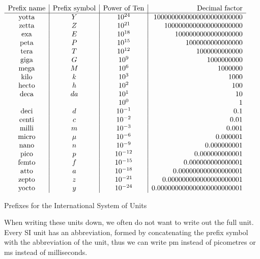 \documentclass{report}
\begin{document}
\begin{table}[h]
  \centering
  $\begin{array}{c|c|c | r}
    \text{Prefix name} & \text{Prefix symbol} & \text{Power of Ten} & \text{Decimal factor}\\
	\hline
	\text{yotta} & Y & 10^{24} & 1 000 000 000 000 000 000 000 000 \\
	\text{zetta} & Z & 10^{21} & 1 000 000 000 000 000 000 000 \\
	\text{exa} & E & 10^{18} &  1 000 000 000 000 000 000\\
	\text{peta} & P & 10^{15} & 1 000 000 000 000 000 \\
	\text{tera} & T & 10^{12} & 1 000 000 000 000 \\
	\text{giga} & G & 10^{9} & 1 000 000 000 \\
	\text{mega} & M & 10^{6} & 1 000 000 \\
	\text{kilo} & k & 10^{3} & 1 000 \\
	\text{hecto} & h & 10^2 & 100 \\
	\text{deca} & da & 10^1 & 10 \\
	& & 10^0 & 1 \\
	\text{deci} & d & 10^{-1} & 0.1 \\
	\text{centi} & c & 10^{-2} & 0.01 \\
	\text{milli} & m & 10^{-3} & 0.001 \\
	\text{micro} & \mu & 10^{-6} & 0.000 001 \\
	\text{nano} & n & 10^{-9} & 0.000 000 001 \\
	\text{pico} & p & 10^{-12} & 0.000 000 000 001 \\
	\text{femto} & f & 10^{-15} & 0.000 000 000 000 001 \\
	\text{atto} & a & 10^{-18} & 0.000 000 000 000 000 001 \\
	\text{zepto} & z & 10^{-21} & 0.000 000 000 000 000 000 001 \\
	\text{yocto} & y & 10^{-24} & 0.000 000 000 000 000 000 000 001 \\
  \end{array}$
  \caption{Prefixes for the International System of Units}
  \label{metricPrefixes}
\end{table}

When writing these units down, we often do not want to write out the full unit. Every SI unit has an abbreviation, formed by concatenating the prefix symbol with the abbreviation of the unit, thus we can write pm instead of picometres or ms instead of milliseconds.
\end{document}
